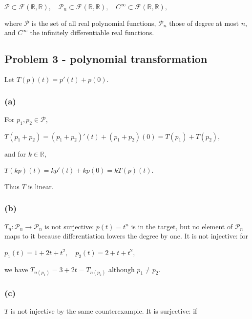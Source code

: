 \(\mathcal{P} \subset \mathcal{F}\left( {\mathbb{R},\mathbb{R}} \right),\quad\mathcal{P}_{n} \subset \mathcal{F}\left( {\mathbb{R},\mathbb{R}} \right),\quad C^{\infty} \subset \mathcal{F}\left( {\mathbb{R},\mathbb{R}} \right),\)

where \(\mathcal{P}\) is the set of all real polynomial functions, \(\mathcal{P}_{n}\) those of degree at most \(n\), and \(C^{\infty}\) the infinitely differentiable real functions.

\subsection{Problem 3 - polynomial transformation}

Let \(T(p)(t) = p'(t) + p(0)\).

\subsubsection{(a)}

For \(p_{1},p_{2} \in \mathcal{P}\),

\(T\left( {p_{1} + p_{2}} \right) = \left( {p_{1} + p_{2}} \right)'(t) + \left( {p_{1} + p_{2}} \right)(0) = T\left( p_{1} \right) + T\left( p_{2} \right),\)

and for \(k \in \mathbb{R}\),

\(T\left( {kp} \right)(t) = kp'(t) + kp(0) = kT(p)(t).\)

Thus \(T\) is linear.

\subsubsection{(b)}

\(T_{n}:\mathcal{P}_{n}\rightarrow\mathcal{P}_{n}\) is not surjective: \(p(t) = t^{n}\) is in the target, but no element of \(\mathcal{P}_{n}\) maps to it because differentiation lowers the degree by one. It is not injective: for

\(p_{1}(t) = 1 + 2t + t^{2},\quad p_{2}(t) = 2 + t + t^{2},\)

we have \(T_{n{(p_{1})}} = 3 + 2t = T_{n{(p_{2})}}\) although \(p_{1} \neq p_{2}\).

\subsubsection{(c)}

\(T\) is not injective by the same counterexample. It is surjective: if

